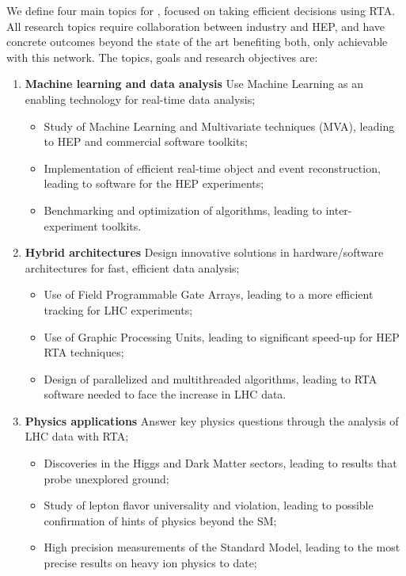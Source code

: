 \vskip2pt
We define four main topics for \acronym, focused on taking efficient decisions using RTA.
All research topics require collaboration between industry and HEP, and have concrete outcomes beyond the state of the art benefiting both, only achievable with this network. 
The \acronym topics, goals and research objectives are:

\begin{enumerate}%

\item\textbf{Machine learning and data analysis} Use Machine Learning as an enabling technology for real-time data analysis;
\begin{itemize}
\item Study of Machine Learning and Multivariate techniques (MVA), leading to HEP and commercial software toolkits; 
\item Implementation of efficient real-time object and event reconstruction, leading to software for the HEP experiments;
\item Benchmarking and optimization of algorithms, leading to inter-experiment toolkits. 
\end{itemize}

\item\textbf{Hybrid architectures} Design innovative solutions in hardware/software architectures for fast, efficient data analysis;
\begin{itemize}
\item Use of Field Programmable Gate Arrays, leading to a more efficient tracking for LHC experiments;%
\item Use of Graphic Processing Units, leading to significant speed-up for HEP RTA techniques;
\item Design of parallelized and multithreaded algorithms, leading to RTA software needed to face the increase in LHC data.
\end{itemize}

\item\textbf{Physics applications} Answer key physics questions through the analysis of LHC data with RTA;
\begin{itemize}
\item Discoveries in the Higgs and Dark Matter sectors, leading to results that probe unexplored ground;
\item Study of lepton flavor universality and violation, leading to possible confirmation of hints of physics beyond the SM;
\item High precision measurements of the Standard Model, leading to the most precise results on heavy ion physics to date;
\end{itemize}


\end{enumerate}
